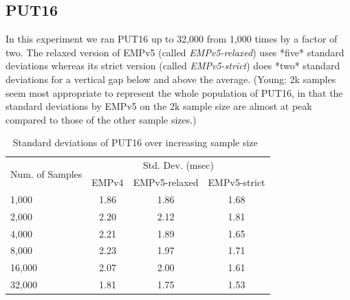 \documentclass[10pt]{article}
\begin{document}
\newpage

\subsection{PUT16~\label{sec:put16_ss}}
In this experiment we ran PUT16 up to 32,000 from 1,000 times by a factor of two.
The relaxed version of EMPv5 (called {\em EMPv5-relaxed}) uses *five* standard deviations 
whereas its strict version (called {\em EMPv5-strict})  does *two* standard deviations for a vertical gap below and above the average.
(Young: 2k samples seem most appropriate to represent the whole population of PUT16, 
in that the standard deviations by EMPv5 on the 2k sample size are almost at peak compared 
to those of the other sample sizes.)

\begin{table}[h]
\centering
{
 \begin{tabular}{|l|c|c|c|} \hline
\multirow{2}{*}{Num. of Samples}   & \multicolumn{3}{|c|}{Std. Dev. (msec)} \\  \cline{2-4}
						    & EMPv4 & EMPv5-relaxed & EMPv5-strict \\  \hline
1,000 & 1.86 & 1.86  & 1.68\\ \hline
2,000 & 2.20 & 2.12 & 1.81\\ \hline
4,000 & 2.21 & 1.89 & 1.65\\ \hline
8,000 & 2.23 & 1.97 & 1.71\\ \hline
16,000 & 2.07 & 2.00 & 1.61\\ \hline
32,000 & 1.81 & 1.75 & 1.53\\ \hline
  \end{tabular}
  }
 \caption{Standard deviations of PUT16 over increasing sample size~\label{fig:put16_std_ss_summary}}
\end{table}

\end{document}
